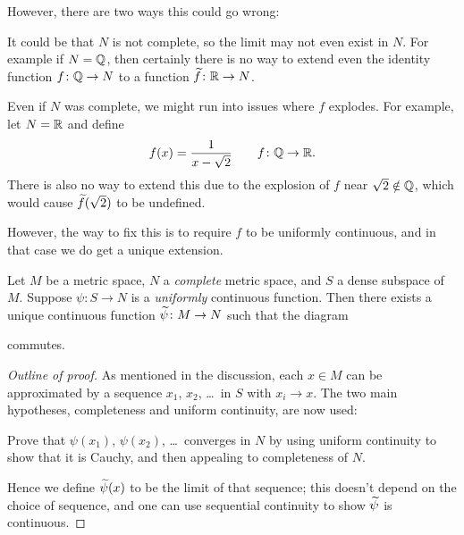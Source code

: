 However, there are two ways this could go wrong:
\begin{example}
	\listhack
	\begin{enumerate}[(a)]
		\ii It could be that $N$ is not complete,
		so the limit may not even exist in $N$.
		For example if $N = \mathbb Q$,
		then certainly there is no way to
		extend even the identity function $f \colon \mathbb Q \to N$
		to a function $\widetilde f \colon \mathbb R \to N$.

		\ii Even if $N$ was complete, we might run into issues
		where $f$ explodes.
		For example, let $N = \mathbb R$ and define
		\[ f(x) = \frac{1}{x-\sqrt2} \qquad f \colon \mathbb Q \to \mathbb R. \]
		There is also no way to extend this
		due to the explosion of $f$ near $\sqrt2 \notin \mathbb Q$,
		which would cause $\widetilde f(\sqrt2)$ to be undefined.
	\end{enumerate}
\end{example}
However, the way to fix this is to require $f$ to be uniformly continuous,
and in that case we do get a unique extension.

\begin{theorem}
	Let $M$ be a metric space, $N$ a \emph{complete} metric space,
	and $S$ a dense subspace of $M$.
	Suppose $\psi \colon S \to N$ is a \emph{uniformly} continuous function.
	Then there exists a unique continuous function $\widetilde \psi \colon M \to N$
	such that the diagram
	\begin{center}
	\end{center}
	commutes.
\end{theorem}
\begin{proof}
	[Outline of proof]
	As mentioned in the discussion,
	each $x \in M$ can be approximated by a
	sequence $x_1$, $x_2$, \dots\ in $S$ with $x_i \to x$.
	The two main hypotheses, completeness and uniform continuity,
	are now used:
	\begin{exercise}
		Prove that $\psi(x_1)$, $\psi(x_2)$, \dots\ converges in $N$
		by using uniform continuity to show that it is Cauchy,
		and then appealing to completeness of $N$.
	\end{exercise}
	Hence we define $\widetilde \psi(x)$ to be the limit of that sequence;
	this doesn't depend on the choice of sequence,
	and one can use sequential continuity to show $\widetilde \psi$ is continuous.
\end{proof}

